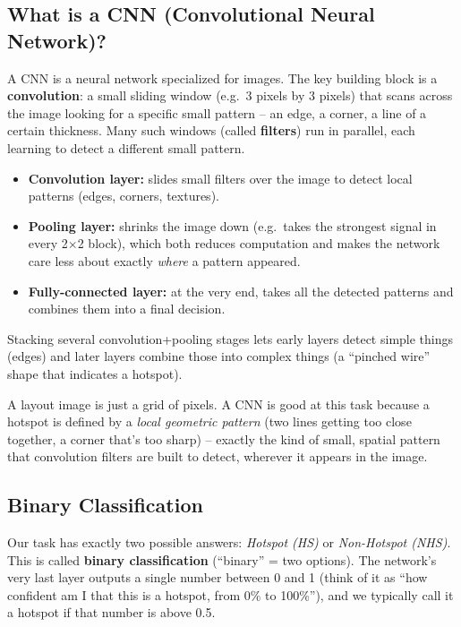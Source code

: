 \documentclass[11pt]{article}
\begin{document}
\subsection{What is a CNN (Convolutional Neural Network)?}
A CNN is a neural network specialized for images. The key building
block is a \textbf{convolution}: a small sliding window (e.g.\ 3
pixels by 3 pixels) that scans across the image looking for a specific
small pattern -- an edge, a corner, a line of a certain thickness.
Many such windows (called \textbf{filters}) run in parallel, each
learning to detect a different small pattern.

\begin{itemize}[leftmargin=1.2em]
    \item \textbf{Convolution layer:} slides small filters over the
    image to detect local patterns (edges, corners, textures).
    \item \textbf{Pooling layer:} shrinks the image down (e.g.\ takes
    the strongest signal in every 2$\times$2 block), which both
    reduces computation and makes the network care less about exactly
    \emph{where} a pattern appeared.
    \item \textbf{Fully-connected layer:} at the very end, takes all
    the detected patterns and combines them into a final decision.
\end{itemize}

Stacking several convolution+pooling stages lets early layers detect
simple things (edges) and later layers combine those into complex
things (a ``pinched wire'' shape that indicates a hotspot).

\begin{keyidea}
A layout image is just a grid of pixels. A CNN is good at this task
because a hotspot is defined by a \emph{local geometric pattern} (two
lines getting too close together, a corner that's too sharp) --
exactly the kind of small, spatial pattern that convolution filters
are built to detect, wherever it appears in the image.
\end{keyidea}

\subsection{Binary Classification}
Our task has exactly two possible answers: \emph{Hotspot (HS)} or
\emph{Non-Hotspot (NHS)}. This is called \textbf{binary
classification} (``binary'' = two options). The network's very last
layer outputs a single number between 0 and 1 (think of it as ``how
confident am I that this is a hotspot, from 0\% to 100\%''), and we
typically call it a hotspot if that number is above 0.5.
\end{document}
